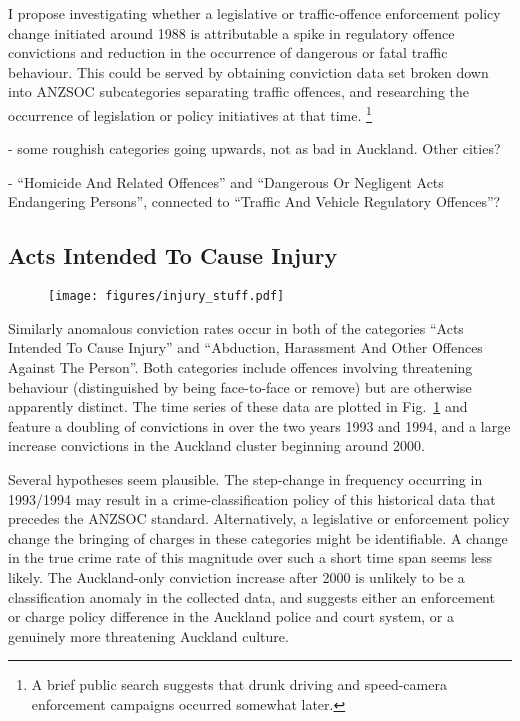\documentclass[onecolumn]{mysimple}
\begin{document}
I propose investigating whether a legislative or traffic-offence enforcement policy change initiated around 1988 is attributable a spike in regulatory offence convictions and reduction in the occurrence of dangerous or fatal traffic behaviour.
This could be served by obtaining conviction data set broken down into ANZSOC subcategories separating traffic offences, and researching the occurrence of legislation or policy initiatives at that time. \footnote{A brief public search suggests that drunk driving and speed-camera enforcement campaigns occurred somewhat later.}


 
 - some roughish categories going upwards, not as bad in Auckland. Other cities?

 - ``Homicide And Related Offences'' and ``Dangerous Or Negligent Acts Endangering Persons'', connected to ``Traffic And Vehicle Regulatory Offences''?


\subsection*{Acts Intended To Cause Injury}

\begin{figure}
  \centering
  \texttt{[image: figures/injury\_stuff.pdf]}
  \caption{}
  \label{fig:injury stuff}
\end{figure}

Similarly anomalous conviction rates occur in both of the categories ``Acts Intended To Cause Injury'' and ``Abduction, Harassment And Other Offences Against The Person''.
Both categories include offences involving threatening behaviour (distinguished by being face-to-face or remove) but are otherwise apparently distinct.
The time series of these data are plotted in Fig.~\ref{fig:injury stuff} and feature a doubling of convictions in over the two years 1993 and 1994, and a large increase convictions in the Auckland cluster beginning around 2000.

Several hypotheses seem plausible.  
The step-change in frequency occurring in 1993/1994 may result in a crime-classification policy of this historical data that precedes the ANZSOC standard.
Alternatively, a legislative or enforcement policy change the bringing of charges in these categories might be identifiable.
A change in the true crime rate of this magnitude over such a short time span seems less likely.
The Auckland-only conviction increase after 2000 is unlikely to be a classification anomaly in the collected data, and suggests either an enforcement or charge policy difference in the Auckland police and court system, or a genuinely more threatening Auckland culture.
\end{document}
